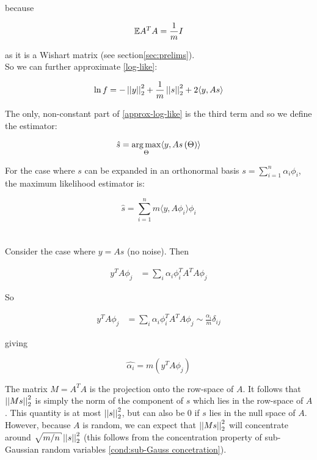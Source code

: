 because

\begin{equation}
{\mathbb{E}}{A^TA} = \frac{1}{m}I
\end{equation}

as it is a Wishart matrix (see section\ref{sec:prelims}). 
\\
So we can further approximate \eqref{log-like}:

\begin{equation}
\ln{f} = - \left|\left|y\right|\right|_2^2 + \frac{1}{m}\left|\left|s\right|\right|_2^2 + 2\langle y, As \rangle
\label{approx-log-like}
\end{equation}

The only, non-constant part of \eqref{approx-log-like} is the third term and so we define the estimator:

\begin{equation}
\hat{s} = \operatorname*{arg\,max}_{\Theta} \langle y , As\left(\Theta\right)\rangle
\label{eq: compressive-estimator}
\end{equation}

For the case where \(s\) can be expanded in an orthonormal basis \(s = \sum_{i=1}^n \alpha_i\phi_i\), the maximum likelihood estimator is:

\begin{equation}
\hat{s} = \sum_{i=1}^n m\langle y, A\phi_i\rangle \phi_i
\end{equation}
\\
\\
Consider the case where \( y = As\) (no noise). Then

\begin{align*}
y^TA\phi_j &= \sum_i \alpha_i \phi_i^TA^TA\phi_j
\end{align*}



So 


\begin{align*}
y^TA\phi_j &= \sum_i \alpha_i \phi_i^TA^TA\phi_j \sim \frac{\alpha_i}{m} \delta_{ij}
\end{align*}

giving
 
\begin{equation}
\hat{\alpha_i} = m\left(y^TA\phi_j\right)
\end{equation}

\begin{remark}
The matrix \(M = A^TA\) is the projection onto the row-space of \(A\). It follows that \(\left|\left|Ms\right|\right|_2^2\) is simply the norm of the component of \(s\) which lies in the row-space of \(A\). This quantity is at most \(\left|\left|s\right|\right|_2^2\), but can also be \(0\) if \(s\) lies in the null space of \(A\). However, because \(A\) is random, we can expect that \(\left|\left|Ms\right|\right|_2^2\) will concentrate around \(\sqrt{m/n}\vectornorm{s}_2^2\) (this follows from the concentration property of sub-Gaussian random variables \eqref{cond:sub-Gauss concetration}).
\end{remark}

